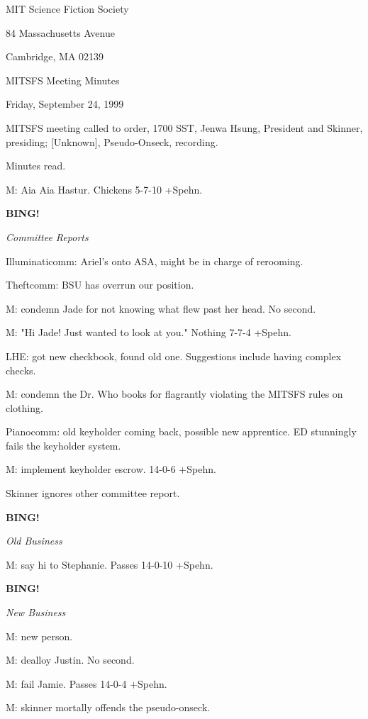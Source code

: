 \documentclass[12pt]{article}
\newcommand{\bing}{{\bf BING!} }
\newcommand{\goto}[1]{\bing \vskip 12pt \centerline{{\em{#1}}}}
\begin{document}
\begin{center}

MIT Science Fiction Society 

84 Massachusetts Avenue

Cambridge, MA 02139

\vspace{12pt}

MITSFS Meeting Minutes 

Friday, September 24, 1999

\end{center}
 
\vspace{18pt}

\setlength{\parskip}{6pt}

\noindent
MITSFS meeting called to order, 1700 SST,
Jenwa Hsung, President and Skinner, presiding; [Unknown], Pseudo-Onseck, recording.

Minutes read.

M: Aia Aia Hastur. Chickens 5-7-10 +Spehn.

\goto{Committee Reports}

Illuminaticomm: Ariel's onto ASA, might be in charge of rerooming.

Theftcomm: BSU has overrun our position.

M: condemn Jade for not knowing what flew past her head. No second.

M: "Hi Jade! Just wanted to look at you." Nothing 7-7-4 +Spehn.

LHE: got new checkbook, found old one. Suggestions include having complex checks.

M: condemn the Dr. Who books for flagrantly violating the MITSFS rules on clothing.

Pianocomm: old keyholder coming back, possible new apprentice. ED stunningly fails the keyholder system.

M: implement keyholder escrow. 14-0-6 +Spehn.

Skinner ignores other committee report.

\goto{Old Business}

M: say hi to Stephanie. Passes 14-0-10 +Spehn.

\goto{New Business}

M: new person.

M: dealloy Justin. No second.

M: fail Jamie. Passes 14-0-4 +Spehn.

M: skinner mortally offends the pseudo-onseck.
\end{document}
